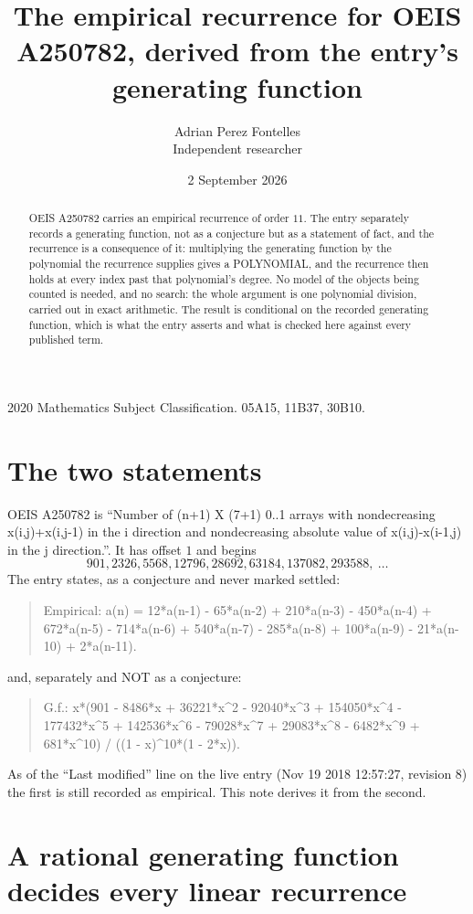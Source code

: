 \documentclass[11pt,a4paper]{article}
\title{The empirical recurrence for OEIS A250782, derived from the entry's generating function}
\author{Adrian Perez Fontelles\\ \small Independent researcher}
\date{2 September 2026}
\theoremstyle{plain}
\theoremstyle{definition}
\begin{document}
\maketitle

\begin{abstract}
OEIS A250782 carries an empirical recurrence of order $11$. The entry separately records a
generating function, not as a conjecture but as a statement of fact, and the recurrence is a
consequence of it: multiplying the generating function by the polynomial the recurrence
supplies gives a POLYNOMIAL, and the recurrence then holds at every index past that
polynomial's degree. No model of the objects being counted is needed, and no search: the
whole argument is one polynomial division, carried out in exact arithmetic. The result is
conditional on the recorded generating function, which is what the entry asserts and what is
checked here against every published term.
\end{abstract}

\noindent\small 2020 Mathematics Subject Classification. 05A15, 11B37, 30B10.\normalsize

\section{The two statements}

OEIS A250782 is ``Number of (n+1) X (7+1) 0..1 arrays with nondecreasing x(i,j)+x(i,j-1) in the i direction and nondecreasing absolute value of x(i,j)-x(i-1,j) in the j direction.''. It has offset $1$ and begins
\[
901, 2326, 5568, 12796, 28692, 63184, 137082, 293588,\ \dots
\]
The entry states, as a conjecture and never marked settled:
\begin{quote}
Empirical: a(n) = 12*a(n-1) - 65*a(n-2) + 210*a(n-3) - 450*a(n-4) + 672*a(n-5) - 714*a(n-6) + 540*a(n-7) - 285*a(n-8) + 100*a(n-9) - 21*a(n-10) + 2*a(n-11).
\end{quote}
and, separately and NOT as a conjecture:
\begin{quote}
G.f.: x*(901 - 8486*x + 36221*x\^{}2 - 92040*x\^{}3 + 154050*x\^{}4 - 177432*x\^{}5 + 142536*x\^{}6 - 79028*x\^{}7 + 29083*x\^{}8 - 6482*x\^{}9 + 681*x\^{}10) / ((1 - x)\^{}10*(1 - 2*x)).
\end{quote}
As of the ``Last modified'' line on the live entry (Nov 19 2018 12:57:27, revision 8) the first is still
recorded as empirical. This note derives it from the second.

\section{A rational generating function decides every linear recurrence}
\end{document}
